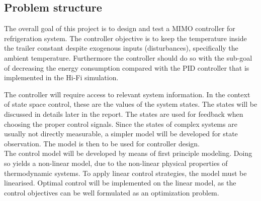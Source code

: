 \subsection{Problem structure}
The overall goal of this project is to design and test a MIMO controller for refrigeration system. The controller objective is to keep the temperature inside the trailer constant despite exogenous inputs (disturbances), specifically the ambient temperature.
Furthermore the controller should do so with the sub-goal of decreasing the energy consumption compared with the PID controller that is implemented in the Hi-Fi simulation.

The controller will require access to relevant system information. In the context of state space control, these are the values of the system states. The states will be discussed in details later in the report. The states are used for feedback when choosing the proper control signals. Since the states of complex systems are usually not directly measurable, a simpler model will be developed for state observation. The model is then to be used for controller design. \\
The control model will be developed by means of first principle modeling. Doing so yields a non-linear model, due to the non-linear physical properties of thermodynamic systems. To apply linear control strategies, the model must be linearised. Optimal control will be implemented on the linear model, as the control objectives can be well formulated as an optimization problem.\\





